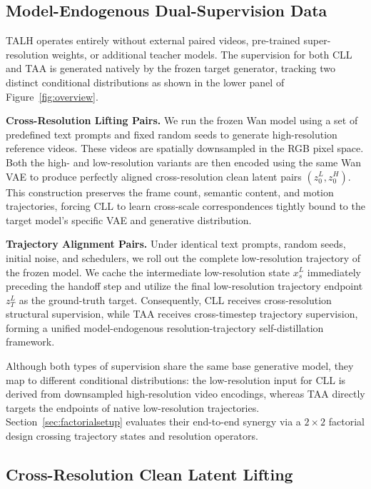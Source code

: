 \subsection{Model-Endogenous Dual-Supervision Data}

TALH operates entirely without external paired videos, pre-trained
super-resolution weights, or additional teacher models. The supervision
for both CLL and TAA is generated natively by the frozen target
generator, tracking two distinct conditional distributions as shown in
the lower panel of Figure~\ref{fig:overview}.

\textbf{Cross-Resolution Lifting Pairs.} We run the frozen Wan model
using a set of predefined text prompts and fixed random seeds to
generate high-resolution reference videos. These videos are spatially
downsampled in the RGB pixel space. Both the high- and low-resolution
variants are then encoded using the same Wan VAE to produce perfectly
aligned cross-resolution clean latent pairs \((z_0^L, z_0^H)\). This
construction preserves the frame count, semantic content, and motion
trajectories, forcing CLL to learn cross-scale correspondences tightly
bound to the target model's specific VAE and generative distribution.

\textbf{Trajectory Alignment Pairs.} Under identical text prompts,
random seeds, initial noise, and schedulers, we roll out the complete
low-resolution trajectory of the frozen model. We cache the intermediate
low-resolution state \(x_s^L\) immediately preceding the handoff step
and utilize the final low-resolution trajectory endpoint \(z_T^L\) as
the ground-truth target. Consequently, CLL receives cross-resolution
structural supervision, while TAA receives cross-timestep trajectory
supervision, forming a unified model-endogenous resolution-trajectory
self-distillation framework.

Although both types of supervision share the same base generative model,
they map to different conditional distributions: the low-resolution
input for CLL is derived from downsampled high-resolution video
encodings, whereas TAA directly targets the endpoints of native
low-resolution trajectories. Section~\ref{sec:factorialsetup} evaluates their end-to-end
synergy via a \(2\times2\) factorial design crossing trajectory states
and resolution operators.

\subsection{Cross-Resolution Clean Latent Lifting}

